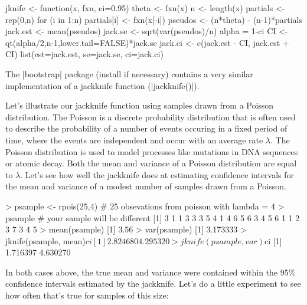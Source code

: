 \begin{R}
jknife <- function(x, fxn, ci=0.95) {
    theta <- fxn(x)
    n <- length(x)
    partials <- rep(0,n)
    for (i in 1:n){
       partials[i] <- fxn(x[-i])
    }
    pseudos <- (n*theta) - (n-1)*partials
    jack.est <- mean(pseudos)
    jack.se <- sqrt(var(pseudos)/n)
    alpha = 1-ci
    CI <- qt(alpha/2,n-1,lower.tail=FALSE)*jack.se
    jack.ci <- c(jack.est - CI, jack.est + CI)
    list(est=jack.est, se=jack.se, ci=jack.ci)
}
\end{R}

The |bootstrap| package (install if necessary) contains a very similar implementation of a jackknife function (|jackknife()|).

Let's illustrate our jackknife function using samples drawn from a Poisson distribution. The Poisson is a discrete probability distribution that is often used to describe the probability of a number of events occuring in a fixed period of time, where the events are independent and occur with an average rate $\lambda$. The Poisson distribution is used to model processes like mutations in DNA sequences or atomic decay.  Both the mean and variance of a Poisson distribution are equal to $\lambda$. Let's see how well the jackknife does at estimating confidence intervals for  the mean and variance of a modest number of samples drawn from a Poisson.

\begin{R}
> psample <- rpois(25,4) # 25 obsevations from poisson with lambda = 4
> psample  # your sample will be different
 [1] 3 1 1 3 3 3 5 4 1 4 6 5 6 3 4 5 6 1 1 2 3 7 3 4 5
> mean(psample)
[1] 3.56
> var(psample)
[1] 3.173333
> jknife(psample, mean)$ci
[1] 2.824680 4.295320
> jknife(psample, var)$ci
[1] 1.716397 4.630270
\end{R}

In both cases above, the true mean and variance were contained within the 95\% confidence intervals estimated by the jackknife. Let's do a little experiment to see how often that's true for samples of this size:



